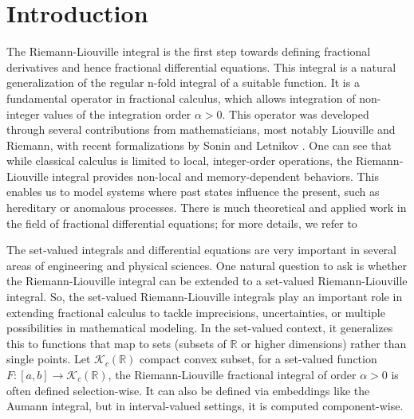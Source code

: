 \documentclass[a4paper,12pt,reqno]{amsart}
\numberwithin{equation}{section}
\theoremstyle{definition}
\theoremstyle{remark}
\numberwithin{equation}{section}
\begin{document}
	
	
	
	\section{Introduction}
   The Riemann-Liouville integral is the first step towards defining fractional derivatives and hence fractional differential equations. This integral is a natural generalization of the regular n-fold integral of a suitable function. It is a fundamental operator in fractional calculus, which allows integration of non-integer values of the integration order $\alpha >0.$ This operator was developed through several contributions from mathematicians, most notably Liouville and Riemann, with recent formalizations by Sonin and Letnikov \cite{pod}. One can see that while classical calculus is limited to local, integer-order operations, the Riemann-Liouville integral provides non-local and memory-dependent behaviors. This enables us to model systems where past states influence the present, such as hereditary or anomalous processes. There is much theoretical and applied work in the field of fractional differential equations; for more details, we refer to \cite{abbas2, jehad1, li2}

    The set-valued integrals and differential equations are very important in several areas of engineering and physical sciences. One natural question to ask is whether the Riemann-Liouville integral can be extended to a set-valued Riemann-Liouville integral. So, the set-valued Riemann-Liouville integrals play an important role in extending fractional calculus to tackle imprecisions, uncertainties, or multiple possibilities in mathematical modeling. In the set-valued context, it generalizes this to functions that map to sets (subsets of $  \mathbb{R}  $ or higher dimensions) rather than single points. Let $\mathcal{K}_c(\mathbb{R})$ compact convex subset, for a set-valued function $F: [a, b] \to \mathcal{K}_c(\mathbb{R})$, the Riemann-Liouville fractional integral of order $\alpha > 0$ is often defined selection-wise. It can also be defined via embeddings like the Aumann integral, but in interval-valued settings, it is computed component-wise. 
\end{document}

